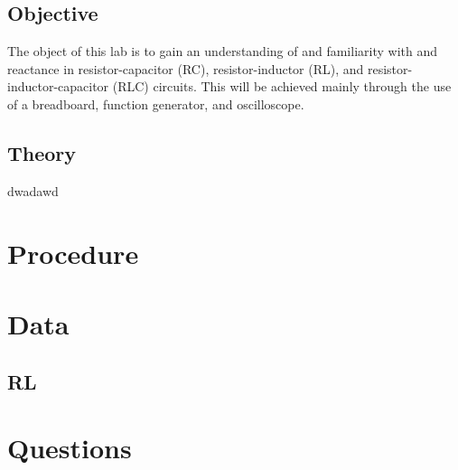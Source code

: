 \documentclass{article}
\begin{document}
		\subsection{Objective}
			The object of this lab is to gain an understanding of and familiarity with and reactance in resistor-capacitor (RC), resistor-inductor (RL), and resistor-inductor-capacitor (RLC) circuits. This will be achieved mainly through the use of a breadboard, function generator, and oscilloscope.

		\subsection{Theory}
			dwadawd

	\section{Procedure}
		

	\section{Data}
		\subsection{RL}
		
	\section{}

	\section{Questions}
\end{document}
